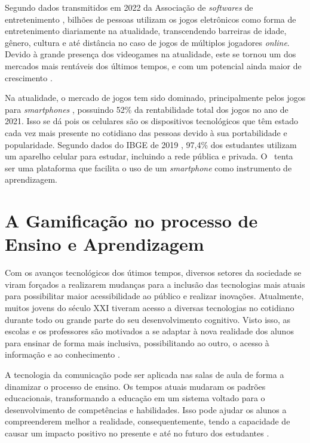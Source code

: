 Segundo dados transmitidos em 2022 da Associação de \textit{softwares} de entretenimento \cite{esa_report_2022}, bilhões de pessoas utilizam os jogos eletrônicos como forma de entretenimento diariamente na atualidade, transcendendo barreiras de idade, gênero, cultura e até distância no caso de jogos de múltiplos jogadores \textit{online}. Devido à grande presença dos videogames na atualidade, este se tornou um dos mercados mais rentáveis dos últimos tempos, e com um potencial ainda maior de crescimento \cite{video-game-economics}.

Na atualidade, o mercado de jogos tem sido dominado, principalmente pelos jogos para \textit{smartphones} \cite{mobile-game-market}, possuindo 52\% da rentabilidade total dos jogos no ano de 2021. Isso se dá pois os celulares são os dispositivos tecnológicos que têm estado cada vez mais presente no cotidiano das pessoas devido à sua portabilidade e popularidade. Segundo dados do IBGE de 2019 \cite{ibge-mobile-use-study}, 97,4\% dos estudantes utilizam um aparelho celular para estudar, incluindo a rede pública e privada. O \appName\ tenta ser uma plataforma que facilita o uso de um \textit{smartphone} como instrumento de aprendizagem.

\section{A Gamificação no processo de Ensino e Aprendizagem}

Com os avanços tecnológicos dos útimos tempos, diversos setores da sociedade se viram forçados a realizarem mudanças para a inclusão das tecnologias mais atuais para possibilitar maior acessibilidade ao público e realizar inovações. Atualmente, muitos jovens do século XXI tiveram acesso a diversas tecnologias no cotidiano durante todo ou grande parte do seu desenvolvimento cognitivo. Visto isso, as escolas e os professores são motivados a se adaptar à nova realidade dos alunos para ensinar de forma mais inclusiva, possibilitando ao outro, o acesso à informação e ao conhecimento \cite{tecnologia-professores}.

A tecnologia da comunicação pode ser aplicada nas salas de aula de forma a dinamizar o processo de ensino. Os tempos atuais mudaram os padrões educacionais, transformando a educação em um sistema voltado para o desenvolvimento de competências e habilidades. Isso pode ajudar os alunos a compreenderem melhor a realidade, consequentemente, tendo a capacidade de causar um impacto positivo no presente e até no futuro dos estudantes \cite{tecnologia-professores}.

